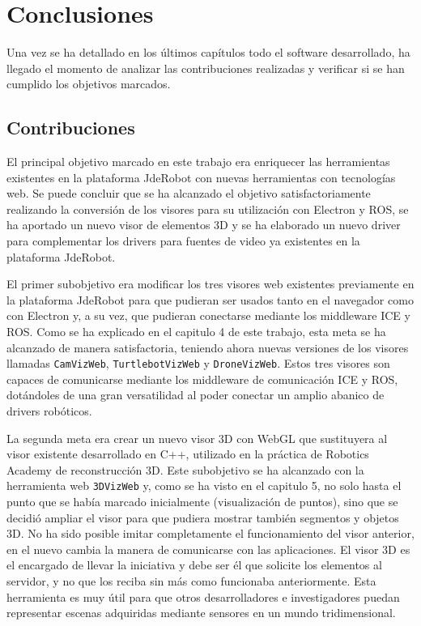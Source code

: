 \chapter{Conclusiones}\label{cap.conclusiones}

Una vez se ha detallado en los últimos capítulos todo el software desarrollado, ha llegado el momento de analizar las contribuciones realizadas y verificar si se han cumplido los objetivos marcados.

\section{Contribuciones}
El principal objetivo marcado en este trabajo era enriquecer las herramientas existentes en la plataforma JdeRobot con nuevas herramientas con tecnologías web. Se puede concluir que se ha alcanzado el objetivo satisfactoriamente realizando la conversión de los visores para su utilización con Electron y ROS, se ha aportado un nuevo visor de elementos 3D y se ha elaborado un nuevo driver para complementar los drivers para fuentes de video ya existentes en la plataforma JdeRobot.

El primer subobjetivo era modificar los tres visores web existentes previamente en la plataforma JdeRobot para que pudieran ser usados tanto en el navegador como con Electron y, a su vez, que pudieran conectarse mediante los middleware ICE y ROS. Como se ha explicado en el capitulo 4 de este trabajo, esta meta se ha alcanzado de manera satisfactoria, teniendo ahora nuevas versiones de los visores llamadas \texttt{CamVizWeb}, \texttt{TurtlebotVizWeb} y \texttt{DroneVizWeb}. Estos tres visores son capaces de comunicarse mediante los middleware de comunicación ICE y ROS, dotándoles de una gran versatilidad al poder conectar un amplio abanico de drivers robóticos.

La segunda meta era crear un nuevo visor 3D con WebGL que sustituyera al visor existente desarrollado en C++, utilizado en la práctica de Robotics Academy de reconstrucción 3D. Este subobjetivo se ha alcanzado con la herramienta web \texttt{3DVizWeb} y, como se ha visto en el capitulo 5, no solo hasta el punto que se había marcado inicialmente (visualización de puntos), sino que se decidió ampliar el visor para que pudiera mostrar también segmentos y objetos 3D. No ha sido posible imitar completamente el funcionamiento del visor anterior, en el nuevo cambia la manera de comunicarse con las aplicaciones. El visor 3D es el encargado de llevar la iniciativa y debe ser él que solicite los elementos al servidor, y no que los reciba sin más como funcionaba anteriormente. Esta herramienta es muy útil para que otros desarrolladores e investigadores puedan representar escenas adquiridas mediante sensores en un mundo tridimensional.

